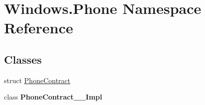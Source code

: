 \hypertarget{namespace_windows_1_1_phone}{}\section{Windows.\+Phone Namespace Reference}
\label{namespace_windows_1_1_phone}
\subsection*{Classes}
\begin{DoxyCompactItemize}
\item 
struct \hyperlink{struct_windows_1_1_phone_1_1_phone_contract}{Phone\+Contract}
\item 
class {\bfseries Phone\+Contract\+\_\+\+\_\+\+Impl}
\end{DoxyCompactItemize}
